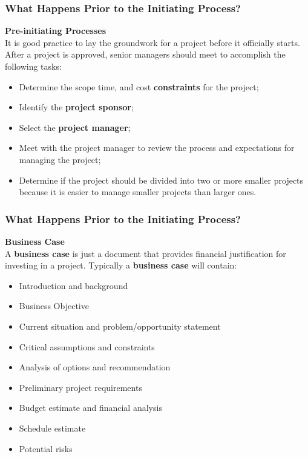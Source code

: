 \documentclass[aspectratio=169]{beamer}
\begin{document}
\begin{frame}
\frametitle{What Happens Prior to the Initiating Process?}
\textbf{Pre-initiating Processes}\\
\vspace{0.5cm}
It is good practice to lay the groundwork for a project before it officially starts. After a project is approved, senior managers should meet to accomplish the following tasks:
\vspace{0.5cm}
\begin{itemize}
\item Determine the scope time, and cost \textbf{constraints} for the project;
\item Identify the \textbf{project sponsor};
\item Select the \textbf{project manager};
\item Meet with the project manager to review the process and expectations for managing the project;
\item Determine if the project should be divided into two or more smaller projects because it is easier to manage smaller projects than larger ones.
\end{itemize}
\end{frame}

\begin{frame}
\frametitle{What Happens Prior to the Initiating Process?}
\textbf{Business Case}\\
\vspace{0.5cm}
A \textbf{business case} is just a document that provides financial justification for investing in a project. Typically a \textbf{business case} will contain:
\begin{itemize}
\item Introduction and background
\item Business Objective
\item Current situation and problem/opportunity statement
\item Critical assumptions and constraints
\item Analysis of options and recommendation
\item Preliminary project requirements
\item Budget estimate and financial analysis
\item Schedule estimate
\item Potential risks
\end{itemize}
\end{frame}
\end{document}
